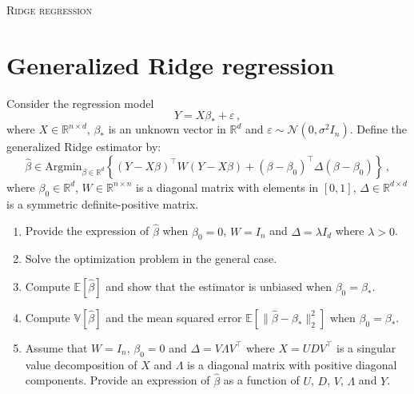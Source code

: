 \documentclass[a4paper,10pt,fleqn]{article}
\newcommand{\rset}{\ensuremath{\mathbb{R}}}
\newcommand{\1}{\ensuremath{\mathbbm{1}}}
\begin{document}

\noindent\hrulefill

\begin{center}
\textsc{Ridge regression}
\end{center}
\hrulefill

\medskip


\section*{Generalized Ridge regression}
Consider the regression model
$$
Y = X\beta_* + \varepsilon\,,
$$
where $X\in\mathbb{R}^{n\times d}$, $\beta_*$ is an unknown vector in $\mathbb{R}^{d}$ and $\varepsilon\sim \mathcal{N}(0,\sigma^2 I_n)$.
Define the generalized Ridge estimator by:
$$
\widehat{\beta} \in \mathrm{Argmin}_{\beta\in \mathbb{R}^{d}} \left\{(Y -X\beta)^\top W (Y-X\beta) + (\beta-\beta_0)^\top \Delta (\beta-\beta_0)\right\}\,,
$$
where $\beta_0 \in \mathbb{R}^{d}$, $W\in\rset^{n\times n}$ is a diagonal matrix with elements in $[0,1]$, $\Delta\in\rset^{d\times d}$ is a symmetric definite-positive matrix.
\begin{enumerate}
\item Provide the expression of $\widehat \beta$ when $\beta_0 = 0$, $W = I_n$ and $\Delta = \lambda I_d$ where $\lambda>0$.
\item Solve the optimization problem in the general case.
\item Compute $\mathbb{E}[\widehat \beta]$ and show that the estimator is unbiased when $\beta_0 = \beta_*$.
\item Compute $\mathbb{V}[\widehat \beta]$ and the mean squared error $\mathbb{E}[\|\widehat \beta-\beta_*\|_2^2]$ when $\beta_0 = \beta_*$.
\item Assume that $W=I_n$, $\beta_0=0$ and $\Delta = V\Lambda 
 V^\top$ where $X = U D V^\top$ is a singular value decomposition of $X$ and $\Lambda$ is a diagonal matrix with positive diagonal components. Provide an expression of $\widehat \beta$ as a function of $U$, $D$, $V$, $\Lambda$ and $Y$.
\end{enumerate}
\end{document}
